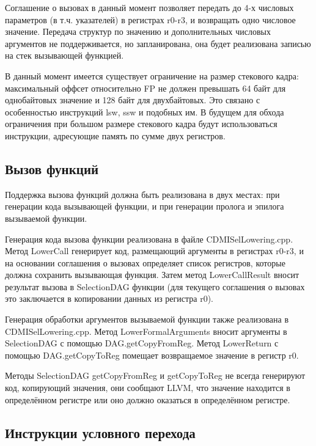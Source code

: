 \documentclass[a4paper,14pt]{extarticle}
\begin{document}
Соглашение о вызовах в данный момент позволяет передать до 4-х числовых параметров (в т.ч. указателей) в регистрах r0-r3, и возвращать одно числовое значение. Передача структур по значению и дополнительных числовых аргументов не поддерживается, но запланирована, она будет реализована записью на стек вызывающей функцией.

В данный момент имеется существует ограничение на размер стекового кадра: максимальный оффсет относительно FP не должен превышать 64 байт для однобайтовых значение и 128 байт для двухбайтовых. Это связано с особенностью инструкций lsw, ssw и подобных им. В будущем для обхода ограничения при большом размере стекового кадра будут использоваться инструкции, адресующие память по сумме двух регистров.

\subsection{Вызов функций}

Поддержка вызова функций должна быть реализована в двух местах: при генерации кода вызывающей функции, и при генерации пролога и эпилога вызываемой функции.

Генерация кода вызова функции реализована в файле CDMISelLowering.cpp. Метод LowerCall генерирует код, размещающий аргументы в регистрах r0-r3, и на основании соглашения о вызовах определяет список регистров, которые должна сохранить вызывающая функция. Затем метод LowerCallResult вносит результат вызова в SelectionDAG функции (для текущего соглашения о вызовах это заключается в копировании данных из регистра r0).

Генерация обработки аргументов вызываемой функции также реализована в CDMISelLowering.cpp. Метод LowerFormalArguments вносит аргументы в SelectionDAG с помощью DAG.getCopyFromReg. Метод LowerReturn с помощью DAG.getCopyToReg помещает возвращаемое значение в регистр r0.

Методы SelectionDAG getCopyFromReg и getCopyToReg не всегда генерируют код, копирующий значения, они сообщают LLVM, что значение находится в определённом регистре или оно должно оказаться в определённом регистре.


\subsection{Инструкции условного перехода}
\end{document}
